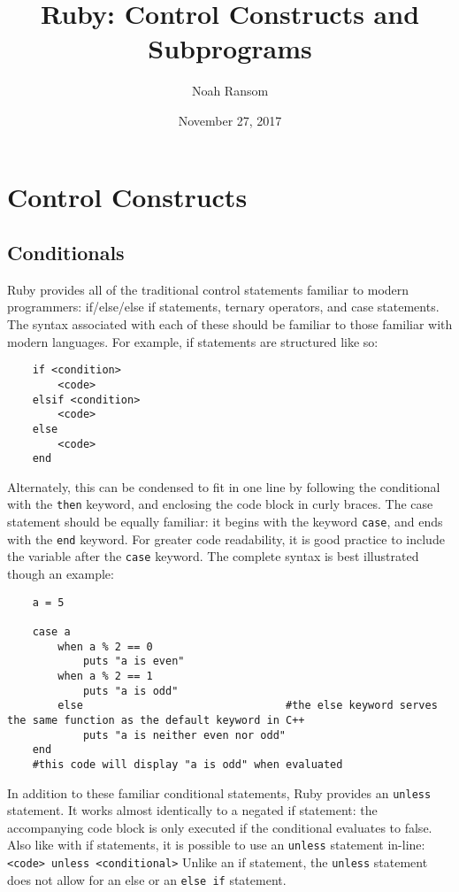 \documentclass[12pt]{article}
\title{Ruby: Control Constructs and Subprograms}
\author{Noah Ransom}
\date{November 27, 2017}
\begin{document}
\maketitle

\pagebreak
\section{Control Constructs}
\subsection{Conditionals}
Ruby provides all of the traditional control statements familiar to modern programmers: if/else/else if statements, ternary operators, and case statements. The syntax associated with each of these should be familiar to those familiar with modern languages. For example, if statements are structured like so:
\begin{lstlisting}
    if <condition>
        <code>
    elsif <condition>
        <code>
    else
        <code>
    end
\end{lstlisting}
Alternately, this can be condensed to fit in one line by following the conditional with the \verb|then| keyword, and enclosing the code block in curly braces\cite{flow_control}. The case statement should be equally familiar: it begins with the keyword \verb|case|, and ends with the \verb|end| keyword. For greater code readability, it is good practice to include the variable after the \verb|case| keyword. The complete syntax is best illustrated though an example:
\begin{lstlisting}
    a = 5
    
    case a
        when a % 2 == 0
            puts "a is even"
        when a % 2 == 1
            puts "a is odd"
        else                                #the else keyword serves the same function as the default keyword in C++
            puts "a is neither even nor odd"
    end
    #this code will display "a is odd" when evaluated
\end{lstlisting}
In addition to these familiar conditional statements, Ruby provides an \verb|unless| statement. It works almost identically to a negated if statement: the accompanying code block is only executed if the conditional evaluates to false\cite{ctrl_struct}. Also like with if statements, it is possible to use an \verb|unless| statement in-line: \verb|<code> unless <conditional>| Unlike an if statement, the \verb|unless| statement does not allow for an else or an \verb|else if| statement\cite{ctrl_struct}. 
\end{document}
